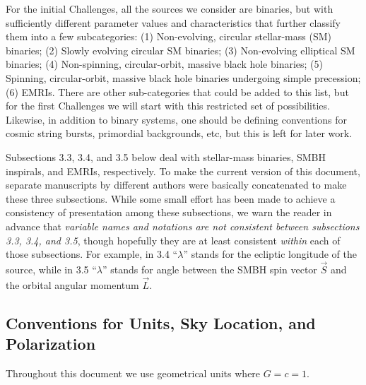 \documentclass[11pt]{report}
\begin{document}
For the initial Challenges, all the sources we consider are binaries, but with sufficiently different
parameter values and characteristics that further classify them into a few subcategories:
(1) Non-evolving, circular stellar-mass (SM) binaries; (2) Slowly evolving circular SM binaries; (3) Non-evolving elliptical SM
binaries; (4) Non-spinning, circular-orbit, massive black hole binaries; (5) Spinning, circular-orbit, massive black hole
binaries undergoing simple precession; (6) EMRIs. There are other sub-categories that could be added to
this list, but for the first Challenges we will start with this restricted set of possibilities. 
Likewise, in addition to binary systems, one should be defining conventions for
cosmic string bursts, primordial backgrounds, etc, but this is left for later work.

Subsections 3.3, 3.4, and 3.5 below deal with stellar-mass binaries, SMBH inspirals, and
EMRIs, respectively. To make the current version of this document, separate manuscripts by
different authors were basically concatenated to make these three subsections.  
While some small effort has been made to achieve a consistency of presentation among these subsections, we
warn the reader in advance that {\it variable names and notations are not consistent between subsections 3.3, 3.4, and 3.5}, 
though hopefully they are at least consistent {\it within} each of those subsections. 
For example, in 3.4 ``$\lambda$'' stands for the ecliptic longitude of the source, while in 3.5 
``$\lambda$'' stands for angle between the SMBH spin vector $\vec S$ and the orbital angular momentum
$\vec L$.

\subsection{Conventions for Units, Sky Location, and Polarization}

Throughout this document we use geometrical units where $G=c=1$.
\end{document}
